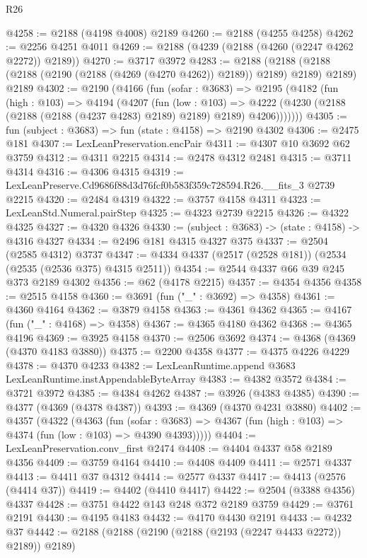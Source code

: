 \begin{lexlean}{R26}
\begin{coremodule}
@4258 := @2188 (@4198 @4008) @2189
@4260 := @2188 (@4255 @4258)
@4262 := @2256 @4251 @4011
@4269 := @2188 (@4239 (@2188 (@4260 (@2247 @4262 @2272)) @2189))
@4270 := @3717 @3972
@4283 := @2188
    (@2188 (@2188 (@2188 (@2190 (@2188 (@4269 (@4270 @4262)) @2189)) @2189) @2189) @2189)
    @2189
@4302 := @2190
    (@4166
      (fun (sofar : @3683) =>
      @2195
        (@4182
          (fun (high : @103) =>
          @4194
            (@4207
              (fun (low : @103) =>
              @4222 (@4230 (@2188 (@2188 (@2188 (@4237 @4283) @2189) @2189) @2189) @4206)))))))
@4305 := fun (subject : @3683) => fun (state : @4158) => @2190 @4302
@4306 := @2475 @181
@4307 := LexLeanPreservation.encPair
@4311 := @4307 @10 @3692 @62 @3759
@4312 := @4311 @2215
@4314 := @2478 @4312 @2481
@4315 := @3711 @4314
@4316 := @4306 @4315
@4319 := LexLeanPreserve.Cd9686f88d3d76fcf0b583f359c728594.R26.__fits_3 @2739 @2215
@4320 := @2484 @4319
@4322 := @3757 @4158 @4311
@4323 := LexLeanStd.Numeral.pairStep
@4325 := @4323 @2739 @2215
@4326 := @4322 @4325
@4327 := @4320 @4326
@4330 := (subject : @3683) -> (state : @4158) -> @4316 @4327
@4334 := @2496 @181 @4315 @4327 @375
@4337 := @2504 (@2585 @4312) @3737
@4347 := @4334 @4337 (@2517 (@2528 @181)) (@2534 (@2535 (@2536 @375) @4315 @2511))
@4354 := @2544 @4337 @66 @39 @245 @373 @2189 @4302
@4356 := @62 (@4178 @2215)
@4357 := @4354 @4356
@4358 := @2515 @4158
@4360 := @3691 (fun ("_" : @3692) => @4358)
@4361 := @4360 @4164
@4362 := @3879 @4158
@4363 := @4361 @4362
@4365 := @4167 (fun ("_" : @4168) => @4358)
@4367 := @4365 @4180 @4362
@4368 := @4365 @4196
@4369 := @3925 @4158
@4370 := @2506 @3692
@4374 := @4368 (@4369 (@4370 @4183 @3880))
@4375 := @2200 @4358
@4377 := @4375 @4226 @4229
@4378 := @4370 @4233
@4382 := LexLeanRuntime.append @3683 LexLeanRuntime.instAppendableByteArray
@4383 := @4382 @3572
@4384 := @3721 @3972
@4385 := @4384 @4262
@4387 := @3926 (@4383 @4385)
@4390 := @4377 (@4369 (@4378 @4387))
@4393 := @4369 (@4370 @4231 @3880)
@4402 := @4357
    (@4322
      (@4363
        (fun (sofar : @3683) =>
        @4367 (fun (high : @103) => @4374 (fun (low : @103) => @4390 @4393)))))
@4404 := LexLeanPreservation.conv_first @2474
@4408 := @4404 @4337 @58 @2189 @4356
@4409 := @3759 @4164
@4410 := @4408 @4409
@4411 := @2571 @4337
@4413 := @4411 @37 @4312
@4414 := @2577 @4337
@4417 := @4413 (@2576 (@4414 @37))
@4419 := @4402 (@4410 @4417)
@4422 := @2504 (@3388 @4356) @4337
@4428 := @3751 @4422 @143 @248 @372 @2189 @3759
@4429 := @3761 @2191
@4430 := @4195 @4183
@4432 := @4170 @4430 @2191
@4433 := @4232 @37
@4442 := @2188 (@2188 (@2190 (@2188 (@2193 (@2247 @4433 @2272)) @2189)) @2189)

\end{coremodule}
\end{lexlean}
